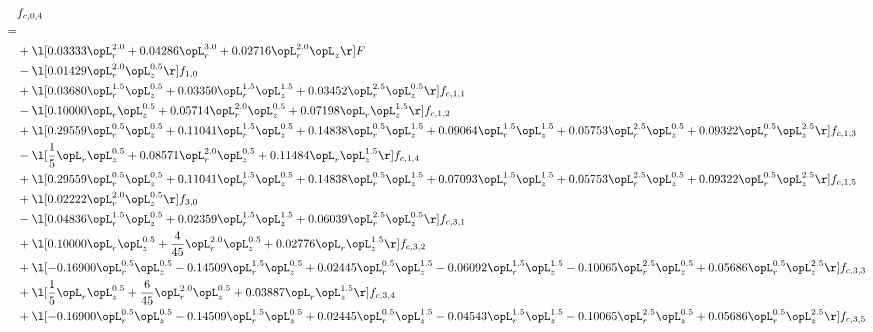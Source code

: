 \begin{alignat}{2} 
\label{eq:f_04_2} 
& f_{c,0,4} \nonumber \\ 
 = \\ 
& + \l[  0.03333 \opL_r^{2.0} +  0.04286 \opL_r^{3.0} +  0.02716 \opL_r^{2.0} \opL_z  \r] F \nonumber \\ 
& - \l[  0.01429 \opL_r^{2.0} \opL_z^{0.5}  \r] f_{1,0} \nonumber \\ 
& + \l[  0.03680 \opL_r^{1.5} \opL_z^{0.5} +  0.03350 \opL_r^{1.5} \opL_z^{1.5} +  0.03452 \opL_r^{2.5} \opL_z^{0.5}  \r] f_{c,1,1} \nonumber \\ 
& - \l[  0.10000 \opL_r \opL_z^{0.5} +  0.05714 \opL_r^{2.0} \opL_z^{0.5} +  0.07198 \opL_r \opL_z^{1.5}  \r] f_{c,1,2} \nonumber \\ 
& + \l[  0.29559 \opL_r^{0.5} \opL_z^{0.5} +  0.11041 \opL_r^{1.5} \opL_z^{0.5} +  0.14838 \opL_r^{0.5} \opL_z^{1.5} +  0.09064 \opL_r^{1.5} \opL_z^{1.5} +  0.05753 \opL_r^{2.5} \opL_z^{0.5} +  0.09322 \opL_r^{0.5} \opL_z^{2.5}  \r] f_{c,1,3} \nonumber \\ 
& - \l[ \frac{1}{5} \opL_r \opL_z^{0.5} +  0.08571 \opL_r^{2.0} \opL_z^{0.5} +  0.11484 \opL_r \opL_z^{1.5}  \r] f_{c,1,4} \nonumber \\ 
& + \l[  0.29559 \opL_r^{0.5} \opL_z^{0.5} +  0.11041 \opL_r^{1.5} \opL_z^{0.5} +  0.14838 \opL_r^{0.5} \opL_z^{1.5} +  0.07093 \opL_r^{1.5} \opL_z^{1.5} +  0.05753 \opL_r^{2.5} \opL_z^{0.5} +  0.09322 \opL_r^{0.5} \opL_z^{2.5}  \r] f_{c,1,5} \nonumber \\ 
& + \l[  0.02222 \opL_r^{2.0} \opL_z^{0.5}  \r] f_{3,0} \nonumber \\ 
& - \l[  0.04836 \opL_r^{1.5} \opL_z^{0.5} +  0.02359 \opL_r^{1.5} \opL_z^{1.5} +  0.06039 \opL_r^{2.5} \opL_z^{0.5}  \r] f_{c,3,1} \nonumber \\ 
& + \l[  0.10000 \opL_r \opL_z^{0.5} + \frac{4}{45} \opL_r^{2.0} \opL_z^{0.5} +  0.02776 \opL_r \opL_z^{1.5}  \r] f_{c,3,2} \nonumber \\ 
& + \l[  -0.16900 \opL_r^{0.5} \opL_z^{0.5}   -0.14509 \opL_r^{1.5} \opL_z^{0.5} +  0.02445 \opL_r^{0.5} \opL_z^{1.5}   -0.06092 \opL_r^{1.5} \opL_z^{1.5}   -0.10065 \opL_r^{2.5} \opL_z^{0.5} +  0.05686 \opL_r^{0.5} \opL_z^{2.5}  \r] f_{c,3,3} \nonumber \\ 
& + \l[ \frac{1}{5} \opL_r \opL_z^{0.5} + \frac{6}{45} \opL_r^{2.0} \opL_z^{0.5} +  0.03887 \opL_r \opL_z^{1.5}  \r] f_{c,3,4} \nonumber \\ 
& + \l[  -0.16900 \opL_r^{0.5} \opL_z^{0.5}   -0.14509 \opL_r^{1.5} \opL_z^{0.5} +  0.02445 \opL_r^{0.5} \opL_z^{1.5}   -0.04543 \opL_r^{1.5} \opL_z^{1.5}   -0.10065 \opL_r^{2.5} \opL_z^{0.5} +  0.05686 \opL_r^{0.5} \opL_z^{2.5}  \r] f_{c,3,5} \nonumber \\ 

\end{alignat}

